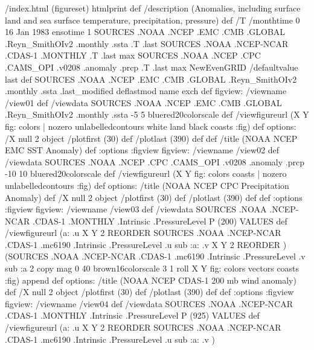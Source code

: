 \begin{ingrid}
/index.html {(figureset) htmlprint} def
/description (Anomalies, including surface land and sea surface temperature, precipitation, pressure) def
/T 
/monthtime
0
16 Jan 1983 ensotime
1
SOURCES .NOAA .NCEP .EMC .CMB .GLOBAL .Reyn_SmithOIv2 .monthly .ssta
.T .last
SOURCES .NOAA .NCEP-NCAR .CDAS-1 .MONTHLY .T .last
max
SOURCES .NOAA .NCEP .CPC .CAMS_OPI .v0208 .anomaly .prcp .T .last
max
NewEvenGRID
/defaultvalue last def
SOURCES .NOAA .NCEP .EMC .CMB .GLOBAL .Reyn_SmithOIv2 .monthly .ssta
.last_modified deflastmod
name exch def
figview:
/viewname /view01 def
/viewdata SOURCES .NOAA .NCEP .EMC .CMB .GLOBAL .Reyn_SmithOIv2 .monthly .ssta
-5 5 bluered20colorscale
def
/viewfigureurl (X Y fig: colors | nozero unlabelledcontours white land black coasts :fig) def
options:
/X null 2 object
/plotfirst (30) def
/plotlast (390) def
def
/title (NOAA NCEP EMC SST Anomaly) def
:options
:figview
figview:
/viewname /view02 def
/viewdata 
SOURCES .NOAA .NCEP .CPC .CAMS_OPI .v0208 .anomaly .prcp
-10 10 bluered20colorscale
  def
/viewfigureurl (X Y fig: colors coasts | nozero unlabelledcontours :fig) def
options:
/title (NOAA NCEP CPC Precipitation Anomaly) def
/X null 2 object
/plotfirst (30) def
/plotlast (390) def
def
:options
:figview
figview:
/viewname /view03 def
/viewdata  SOURCES .NOAA .NCEP-NCAR .CDAS-1 .MONTHLY .Intrinsic .PressureLevel
  P (200) VALUES
  def
/viewfigureurl (a: .u X Y 2 REORDER SOURCES .NOAA .NCEP-NCAR .CDAS-1 .mc6190 .Intrinsic .PressureLevel .u sub :a: .v X Y 2 REORDER )
(SOURCES .NOAA .NCEP-NCAR .CDAS-1 .mc6190 .Intrinsic .PressureLevel .v sub :a 2 copy  mag 0 40 brown16colorscale 3 1 roll X Y fig: colors vectors coasts :fig) append def
options:
/title (NOAA NCEP CDAS-1 200 mb wind anomaly) def
/X null 2 object
/plotfirst (30) def
/plotlast (390) def
def
:options
:figview
figview:
/viewname /view04 def
/viewdata  SOURCES .NOAA .NCEP-NCAR .CDAS-1 .MONTHLY .Intrinsic .PressureLevel
  P (925) VALUES
  def
/viewfigureurl (a: .u X Y 2 REORDER SOURCES .NOAA .NCEP-NCAR .CDAS-1 .mc6190 .Intrinsic .PressureLevel .u sub :a: .v )

\end{ingrid}
